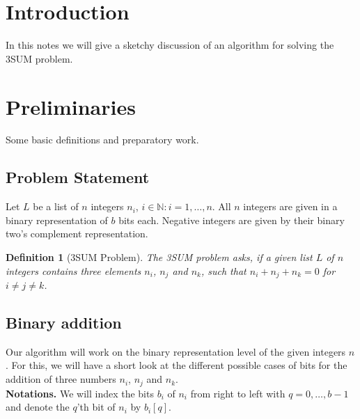 \documentclass{article}
\newtheorem*{theorem A}{Theorem A}
\newtheorem*{theorem B}{N\"olker's Theorem}
\newtheorem{definition}{Definition}
\theoremstyle{remark}
\theoremstyle{remark}
\begin{document}
\section{Introduction}
\label{s:introduction}
In this notes we will give a sketchy discussion of an algorithm for solving the 3SUM problem.
\section{Preliminaries}
\label{s:preliminaries}
Some basic definitions and preparatory work.
\subsection{Problem Statement}
\label{ss:problemstatement}
Let $L$ be a list of $n$ integers $n_{i}$, $i \in \mathbb{N}: i = 1,\dots, n$. All $n$ integers are given in a binary representation of $b$ bits each. Negative integers are given by their binary two's complement representation.

\begin{definition}[3SUM Problem]
    The 3SUM problem asks, if a given list $L$ of $n$ integers contains three elements $n_{i}$, $n_{j}$ and $n_{k}$, such that $n_{i} + n_{j} + n_{k} = 0$ for $i \neq j \neq k$.
\label{def:3sumproblem}
\end{definition}
\subsection{Binary addition}
\label{ss:binaryaddition}
Our algorithm will work on the binary representation level of the given integers $n$. For this, we will have a short look at the different possible cases of bits for the addition of three numbers $n_{i}$, $n_{j}$ and $n_{k}$.\\

\textbf{Notations.} We will index the bits $b_{i}$ of $n_{i}$ from right to left with $q = 0, \dots, b - 1$ and denote the $q$'th bit of $n_{i}$ by $b_{i}[q]$.
\end{document}
